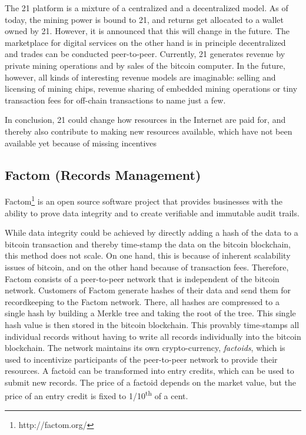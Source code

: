 The 21 platform is a mixture of a centralized and a decentralized model. As of 
today, the mining power is bound to 21, and returns get allocated to a wallet owned 
by 21. However, it is announced that this will change in the future. The marketplace 
for digital services on the other hand is in principle decentralized and trades 
can be conducted peer-to-peer. Currently, 21 generates revenue by private mining 
operations and by sales of the bitcoin computer. In the future, however, all kinds 
of interesting revenue models are imaginable: selling and licensing of mining chips, 
revenue sharing of embedded mining operations or tiny transaction fees for off-chain 
transactions to name just a few. 

In conclusion, 21 could change how resources in the Internet are paid for, and 
thereby also contribute to making new resources available, which have not been 
available yet because of missing incentives

\subsection{Factom (Records Management)}
\label{sec:ecofactom}

Factom\footnote{http://factom.org/} is an open source software project that provides businesses with 
the ability to prove data integrity and to create verifiable and immutable audit 
trails. 

While data integrity could be achieved by directly adding a hash of the data to 
a bitcoin transaction and thereby time-stamp the data on the bitcoin blockchain, 
this method does not scale. On one hand, this is because of inherent scalability 
issues of bitcoin, and on the other hand because of transaction fees. Therefore, 
Factom consists of a peer-to-peer network that is independent of the bitcoin network. 
Customers of Factom generate hashes of their data and send them for recordkeeping 
to the Factom network. There, all hashes are compressed to a single hash by building 
a Merkle tree and taking the root of the tree. This single hash 
value is then stored in the bitcoin blockchain. This provably time-stamps all individual 
records without having to write all records individually into the bitcoin blockchain. 
The network maintains its own crypto-currency, \emph{factoids}, which is used to incentivize 
participants of the peer-to-peer network to provide their resources. A factoid 
can be transformed into entry credits, which can be used to submit new records. 
The price of a factoid depends on the market value, but the price of an entry credit 
is fixed to 1/10\textsuperscript{th} of a cent. 

